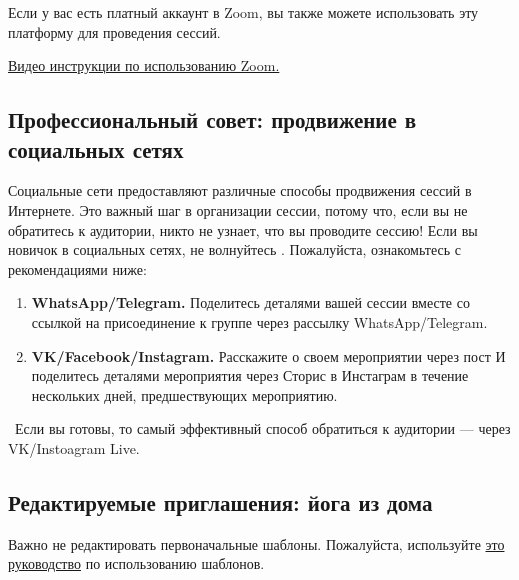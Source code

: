 Если у вас есть платный аккаунт в Zoom, вы также можете использовать эту платформу для проведения сессий.

\href{https://drive.google.com/file/d/1aqEODSOCmS3BdFkcbs-sf_Aa1cjpd37d/view?usp=sharing}{Видео инструкции по использованию Zoom.}

\subsection*{Профессиональный совет: продвижение в социальных сетях}
\label{sec:profAdv2}

Социальные сети предоставляют различные способы продвижения сессий в Интернете. Это важный шаг в организации сессии, потому что, если вы не обратитесь к аудитории, никто не узнает, что вы проводите сессию!
Если вы новичок в социальных сетях, не волнуйтесь \faSmileO. Пожалуйста, ознакомьтесь с рекомендациями ниже:
\begin{enumerate}
    \item \textbf{WhatsApp/Telegram.} Поделитесь деталями вашей сессии вместе со ссылкой на присоединение к группе через рассылку WhatsApp/Telegram.
    \item \textbf{VK/Facebook/Instagram.} Расскажите о своем мероприятии через пост И поделитесь деталями мероприятия через Сторис в Инстаграм в течение нескольких дней, предшествующих мероприятию.
\end{enumerate}


\faLightbulbO\ Если вы готовы, то самый эффективный способ обратиться к аудитории — через VK/Instoagram Live.

\subsection*{Редактируемые приглашения: йога из дома}
\label{sec:invites}
Важно не редактировать первоначальные шаблоны. Пожалуйста, используйте \href{https://docs.google.com/file/d/1sdxy89oBTJ6PNSrEM1bYZ5grWjE6ot-6/edit?usp=docslist_api&filetype=msword}{это руководство} по использованию шаблонов. 
